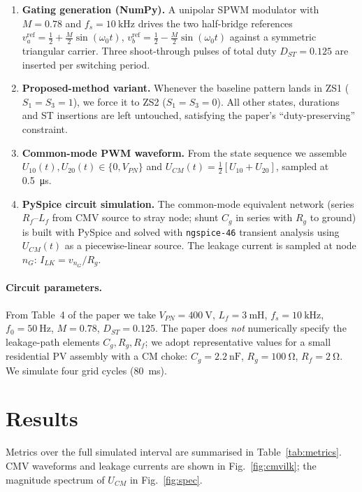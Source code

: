 \documentclass[11pt]{article}
\begin{document}
\begin{enumerate}
\item \textbf{Gating generation (NumPy).}  A unipolar SPWM
  modulator with $M=0.78$ and $f_s=\SI{10}{\kilo\hertz}$ drives the
  two half-bridge references
  $v^{\mathrm{ref}}_a=\tfrac12+\tfrac M2\sin(\omega_0 t)$,
  $v^{\mathrm{ref}}_b=\tfrac12-\tfrac M2\sin(\omega_0 t)$ against a
  symmetric triangular carrier.  Three shoot-through pulses of
  total duty $D_{ST}=0.125$ are inserted per switching period.
\item \textbf{Proposed-method variant.}  Whenever the baseline
  pattern lands in ZS1 ($S_1\!=\!S_3\!=\!1$), we force it to ZS2
  ($S_1\!=\!S_3\!=\!0$).  All other states, durations and ST
  insertions are left untouched, satisfying the paper's
  ``duty-preserving'' constraint.
\item \textbf{Common-mode PWM waveform.}  From the state sequence
  we assemble
  $U_{10}(t),U_{20}(t)\in\{0,V_{PN}\}$ and
  $U_{CM}(t)=\tfrac12[U_{10}+U_{20}]$, sampled at \SI{0.5}{\micro\second}.
\item \textbf{PySpice circuit simulation.}  The common-mode
  equivalent network (series $R_f$--$L_f$ from CMV source to stray
  node; shunt $C_g$ in series with $R_g$ to ground) is built with
  PySpice and solved with \texttt{ngspice-46} transient analysis
  using $U_{CM}(t)$ as a piecewise-linear source.  The leakage
  current is sampled at node $n_G$:
  $I_{LK}=v_{n_G}/R_g$.
\end{enumerate}

\paragraph{Circuit parameters.}
From Table~4 of the paper we take $V_{PN}=\SI{400}{\volt}$,
$L_f=\SI{3}{\milli\henry}$, $f_s=\SI{10}{\kilo\hertz}$,
$f_0=\SI{50}{\hertz}$, $M=0.78$, $D_{ST}=0.125$.  The paper does
\emph{not} numerically specify the leakage-path elements
$C_g,R_g,R_f$; we adopt representative values for a small
residential PV assembly with a CM choke: $C_g=\SI{2.2}{\nano\farad}$,
$R_g=\SI{100}{\ohm}$, $R_f=\SI{2}{\ohm}$.  We simulate four grid
cycles (\SI{80}{\milli\second}).

\section{Results}

Metrics over the full simulated interval are summarised in
Table~\ref{tab:metrics}.  CMV waveforms and leakage currents are
shown in Fig.~\ref{fig:cmvilk}; the magnitude spectrum of $U_{CM}$
in Fig.~\ref{fig:spec}.
\end{document}
